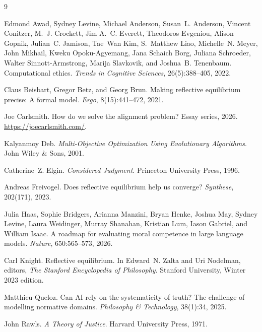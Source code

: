 \documentclass{article}
\begin{document}
\begin{thebibliography}{9}

Edmond Awad, Sydney Levine, Michael Anderson, Susan~L. Anderson, Vincent Conitzer,
M.~J. Crockett, Jim A.~C. Everett, Theodoros Evgeniou, Alison Gopnik,
Julian~C. Jamison, Tae~Wan Kim, S.~Matthew Liao, Michelle~N. Meyer,
John Mikhail, Kweku Opoku-Agyemang, Jana Schaich Borg, Juliana Schroeder,
Walter Sinnott-Armstrong, Marija Slavkovik, and Joshua~B. Tenenbaum.
\newblock Computational ethics.
\newblock \emph{Trends in Cognitive Sciences}, 26(5):388--405, 2022.

Claus Beisbart, Gregor Betz, and Georg Brun.
\newblock Making reflective equilibrium precise: A formal model.
\newblock \emph{Ergo}, 8(15):441--472, 2021.

Joe Carlsmith.
\newblock How do we solve the alignment problem?
\newblock Essay series, 2026.
\newblock \url{https://joecarlsmith.com/}.

Kalyanmoy Deb.
\newblock \emph{Multi-Objective Optimization Using Evolutionary Algorithms}.
\newblock John Wiley \& Sons, 2001.

Catherine~Z. Elgin.
\newblock \emph{Considered Judgment}.
\newblock Princeton University Press, 1996.

Andreas Freivogel.
\newblock Does reflective equilibrium help us converge?
\newblock \emph{Synthese}, 202(171), 2023.

Julia Haas, Sophie Bridgers, Arianna Manzini, Bryan Henke, Joshua May,
Sydney Levine, Laura Weidinger, Murray Shanahan, Kristian Lum,
Iason Gabriel, and William Isaac.
\newblock A roadmap for evaluating moral competence in large language models.
\newblock \emph{Nature}, 650:565--573, 2026.

Carl Knight.
\newblock Reflective equilibrium.
\newblock In Edward~N. Zalta and Uri Nodelman, editors, \emph{The Stanford
  Encyclopedia of Philosophy}. Stanford University, Winter 2023 edition.

Matthieu Queloz.
\newblock Can AI rely on the systematicity of truth? The challenge of modelling
  normative domains.
\newblock \emph{Philosophy \& Technology}, 38(1):34, 2025.

John Rawls.
\newblock \emph{A Theory of Justice}.
\newblock Harvard University Press, 1971.

\end{thebibliography}
\end{document}
